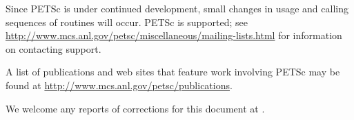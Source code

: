 Since PETSc is under continued development, small changes in usage and
calling sequences of routines will occur.  PETSc is supported; see
\href{http://www.mcs.anl.gov/petsc/miscellaneous/mailing-lists.html}{http://www.mcs.anl.gov/petsc/miscellaneous/mailing-lists.html}
for information on contacting support.

A list of publications and web sites that feature work involving PETSc may be found at
\href{http://www.mcs.anl.gov/petsc/publications}{http://www.mcs.anl.gov/petsc/publications}.

We welcome any reports of corrections for this document at .

\medskip \medskip



